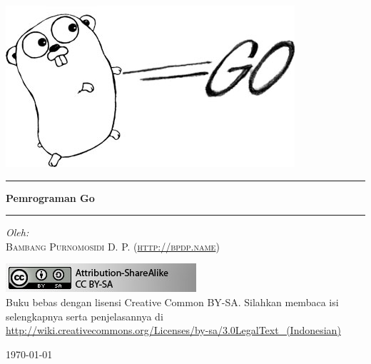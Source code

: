 \begin{titlepage}

\begin{center}

\includegraphics[scale=1]{images/Go-Google-programming-language.jpg}\\[1cm]

%

\hrule\vspace{5mm}
\noindent
{ \huge \bfseries Pemrograman Go}\\[0.4cm]
\hrule\vspace{15mm}

\begin{center} \small
\emph{Oleh:}\\
\vspace{20mm}
\textsc{Bambang Purnomosidi D. P. (\url{http://bpdp.name})}\\
\end{center}


\includegraphics[scale=1]{images/cc-by-sa.jpg}\\[1cm]

Buku bebas dengan lisensi Creative Common BY-SA. Silahkan membaca isi selengkapnya serta penjelasannya di \url{http://wiki.creativecommons.org/Licenses/by-sa/3.0LegalText_(Indonesian)}

\vfill

{\large \today}

\end{center}

\end{titlepage}
